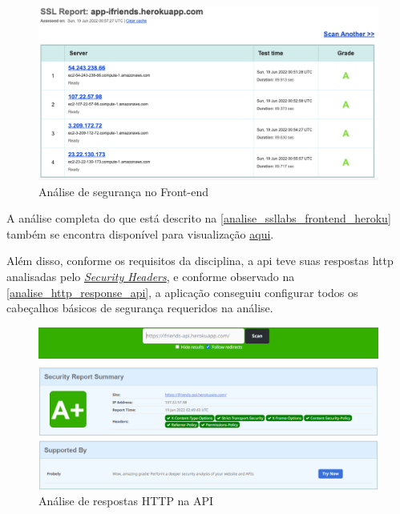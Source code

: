 \begin{figure}[htb]
\centering
\caption{\label{analise_ssllabs_frontend_heroku} Análise de segurança no Front-end}
\includegraphics[width=1\textwidth]{anexos/Imagens_Seguranca/analise_ssllabs_frontend_heroku.png}
\end{figure}
\FloatBarrier

A análise completa do que está descrito na  \autoref{analise_ssllabs_frontend_heroku} também se encontra disponível para visualização \href{https://www.ssllabs.com/ssltest/analyze.html?d=ifriends-api.herokuapp.com}{aqui}.

Além disso, conforme os requisitos da disciplina, a \acs{api} teve suas respostas \acs{http} analisadas pelo \href{https://securityheaders.io}{\textit{Security Headers}}, e conforme observado na \autoref{analise_http_response_api}, a aplicação conseguiu configurar todos os cabeçalhos básicos de segurança requeridos na análise.

\begin{figure}[htb]
\centering
\caption{\label{analise_http_response_api} Análise de respostas HTTP na API}
\includegraphics[width=1\textwidth]{anexos/Imagens_Seguranca/analise_http_response_api.png}
\end{figure}
\FloatBarrier

